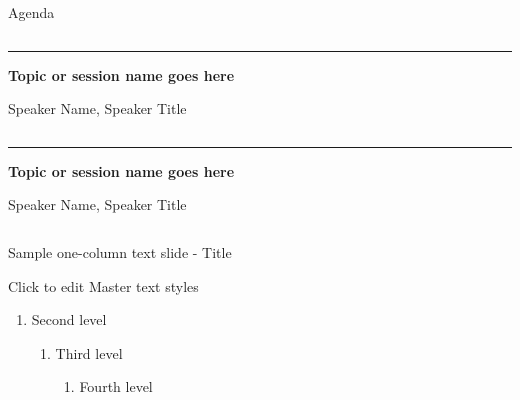 \documentclass[aspectratio=169, t, 9pt]{beamer} %
\begin{document}
\begin{frame}[FloatingTitle]{Agenda}
\begin{groupcolumns}
\begin{column}{0.3\textwidth}
        \vspace{8pt}
        \hrule %
        \vspace{8pt}

        \textbf{Topic or session name goes here}
        \vspace{4pt}

        Speaker Name, Speaker Title
    \end{column}
    \begin{column}{0.3\textwidth}

        \vspace{8pt}
        \hrule %
        \vspace{8pt}

        \textbf{Topic or session name goes here}
        \vspace{4pt}

        Speaker Name, Speaker Title
    \end{column}
    \hfill
\end{groupcolumns}
\end{frame}


\begin{frame}{Sample one-column text slide - Title}

Click to edit Master text styles
\begin{enumerate}
    \item Second level
    \begin{enumerate}
        \item Third level
        \begin{enumerate}
            \item Fourth level
        \end{enumerate}
    \end{enumerate}
\end{enumerate}
\end{frame}
\end{document}
